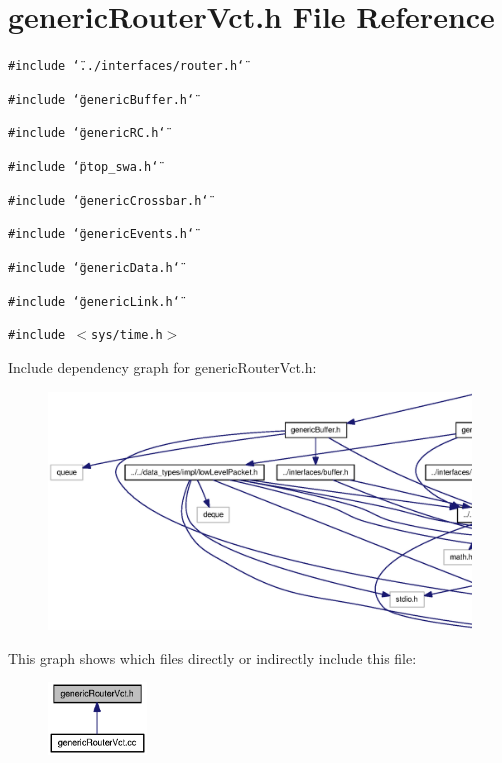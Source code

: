 \section{genericRouterVct.h File Reference}
\label{genericRouterVct_8h}
{\tt \#include \char`\"{}../interfaces/router.h\char`\"{}}\par
{\tt \#include \char`\"{}genericBuffer.h\char`\"{}}\par
{\tt \#include \char`\"{}genericRC.h\char`\"{}}\par
{\tt \#include \char`\"{}ptop\_\-swa.h\char`\"{}}\par
{\tt \#include \char`\"{}genericCrossbar.h\char`\"{}}\par
{\tt \#include \char`\"{}genericEvents.h\char`\"{}}\par
{\tt \#include \char`\"{}genericData.h\char`\"{}}\par
{\tt \#include \char`\"{}genericLink.h\char`\"{}}\par
{\tt \#include $<$sys/time.h$>$}\par


Include dependency graph for genericRouterVct.h:\nopagebreak
\begin{figure}[H]
\begin{center}
\leavevmode
\includegraphics[width=420pt]{genericRouterVct_8h__incl}
\end{center}
\end{figure}


This graph shows which files directly or indirectly include this file:\nopagebreak
\begin{figure}[H]
\begin{center}
\leavevmode
\includegraphics[width=74pt]{genericRouterVct_8h__dep__incl}
\end{center}
\end{figure}

